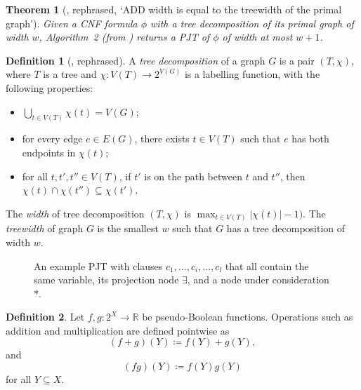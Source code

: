 \documentclass{article}
\newtheorem{theorem}{Theorem}
\theoremstyle{definition}
\newtheorem{definition}{Definition}
\theoremstyle{remark}
\begin{document}
\begin{theorem}[\cite{DBLP:conf/cp/DudekPV20}, rephrased, `ADD width is equal
  to the treewidth of the primal graph']
  Given a CNF formula $\phi$ with a tree decomposition of its primal graph of
  width $w$, Algorithm~2 (from \cite{DBLP:conf/cp/DudekPV20}) returns a
  PJT of $\phi$ of width at most $w+1$.
\end{theorem}

\begin{definition}[\cite{DBLP:journals/jct/RobertsonS84}, rephrased]
  A \emph{tree decomposition} of a graph $G$ is a pair $(T, \chi)$, where $T$ is
  a tree and $\chi\colon V(T) \to 2^{V(G)}$ is a labelling function, with the
  following properties:
  \begin{itemize}
  \item $\bigcup_{t \in V(T)} \chi(t) = V(G)$;
  \item for every edge $e \in E(G)$, there exists $t \in V(T)$ such that $e$ has
    both endpoints in $\chi(t)$;
  \item for all $t, t', t'' \in V(T)$, if $t'$ is on the path between $t$ and
    $t''$, then $\chi(t) \cap \chi(t'') \subseteq \chi(t')$.
  \end{itemize}
  The \emph{width} of tree decomposition $(T, \chi)$ is $\max_{t \in V(T)}
  |\chi(t)| - 1)$. The \emph{treewidth} of graph $G$ is the smallest $w$ such
  that $G$ has a tree decomposition of width $w$.
\end{definition}

\begin{figure}
  \centering
  \caption{An example PJT with clauses $c_1, \dots, c_i, \dots, c_l$ that all
    contain the same variable, its projection node $\exists$, and a node under
    consideration $\ast$.}
  \label{fig:example_pjt}
\end{figure}

\begin{definition}
  Let $f, g\colon 2^X \to \mathbb{R}$ be pseudo-Boolean functions. Operations
  such as addition and multiplication are defined pointwise as
  \[
    (f+g)(Y) \coloneqq f(Y)+g(Y),
  \]
  and
  \[
    (fg)(Y) \coloneqq f(Y)g(Y)
  \]
  for all $Y \subseteq X$.
\end{definition}
\end{document}
